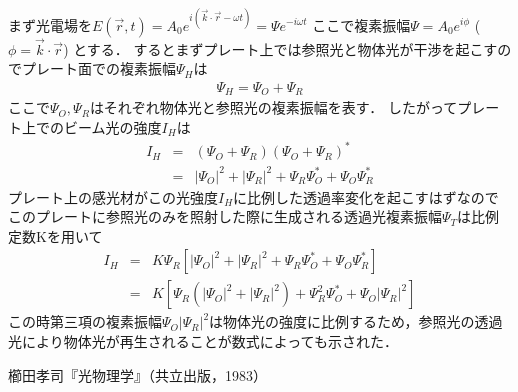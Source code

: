 \documentclass[11pt, a4paper]{jsarticle}
\begin{document}
まず光電場を$E(\vec{r},t) = A_0e^{i(\vec{k} \cdot \vec{r} - {\omega}t)} = \Psi e^{-i{\omega}t}$
ここで複素振幅$\Psi = A_0e^{i\phi}$ ($\phi = \vec{k} \cdot \vec{r}$)
とする．
するとまずプレート上では参照光と物体光が干渉を起こすのでプレート面での複素振幅$\Psi_H$は
\begin{eqnarray*}
  \Psi_H = \Psi_O + \Psi_R
\end{eqnarray*}
ここで$\Psi_O,\Psi_R$はそれぞれ物体光と参照光の複素振幅を表す．
したがってプレート上でのビーム光の強度$I_H$は
\begin{eqnarray*}
  I_H &=& (\Psi_O + \Psi_R)(\Psi_O + \Psi_R)^\ast \\
      &=&|\Psi_O|^2 + |\Psi_R|^2 + \Psi_R\Psi_O^\ast + \Psi_O\Psi_R^\ast
\end{eqnarray*}
プレート上の感光材がこの光強度$I_H$に比例した透過率変化を起こすはずなのでこのプレートに参照光のみを照射した際に生成される透過光複素振幅$\Psi_T$は比例定数Kを用いて
\begin{eqnarray*}
  I_H &=& K\Psi_R[|\Psi_O|^2 + |\Psi_R|^2 + \Psi_R\Psi_O^\ast + \Psi_O\Psi_R^\ast] \\
    &=& K[\Psi_R(|\Psi_O|^2 + |\Psi_R|^2) + \Psi_R^2\Psi_O^\ast + \Psi_O|\Psi_R|^2]
\end{eqnarray*}
この時第三項の複素振幅$\Psi_O|\Psi_R|^2$は物体光の強度に比例するため，参照光の透過光により物体光が再生されることが数式によっても示された．

\begin{thebibliography}{99}
  櫛田孝司『光物理学』（共立出版，1983）
\end{thebibliography}

\end{document}
